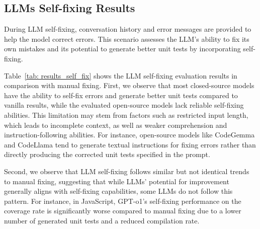 

\subsection{LLMs Self-fixing Results}
\label{sec: self-fixing}

During LLM self-fixing, conversation history and error messages are provided to help the model correct errors. This scenario assesses the LLM’s ability to fix its own mistakes and its potential to generate better unit tests by incorporating self-fixing.

Table~\ref{tab: results_self_fix} shows the LLM self-fixing evaluation results in comparison with manual fixing. First, we observe that most closed-source models have the ability to self-fix errors and generate better unit tests compared to vanilla results, while the evaluated open-source models lack reliable self-fixing abilities. This limitation may stem from factors such as restricted input length, which leads to incomplete context, as well as weaker comprehension and instruction-following abilities. For instance, open-source models like CodeGemma and CodeLlama tend to generate textual instructions for fixing errors rather than directly producing the corrected unit tests specified in the prompt.

Second, we observe that LLM self-fixing follows similar but not identical trends to manual fixing, suggesting that while LLMs' potential for improvement generally aligns with self-fixing capabilities, some LLMs do not follow this pattern. For instance, in JavaScript, GPT-o1’s self-fixing performance on the coverage rate is significantly worse compared to manual fixing due to a lower number of generated unit tests and a reduced compilation rate.

